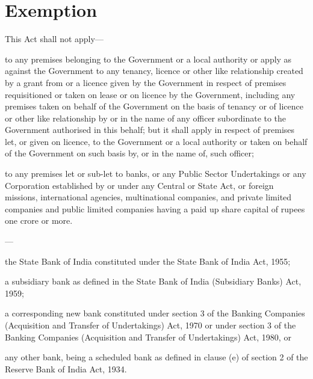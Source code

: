 \documentclass{mhact}
\begin{document}
\section{Exemption}
\begin{subsectionlist}
\item This Act shall not apply---
  \begin{clause}
  \item to any premises belonging to the Government or a local
    authority or apply as against the Government to any tenancy,
    licence or other like relationship created by a grant from or a
    licence given by the Government in respect of premises
    requisitioned or taken on lease or on licence by the Government,
    including any premises taken on behalf of the Government on the
    basis of tenancy or of licence or other like relationship by or in
    the name of any officer subordinate to the Government authorised
    in this behalf; but it shall apply in respect of premises let, or
    given on licence, to the Government or a local authority or taken
    on behalf of the Government on such basis by, or in the name of,
    such officer;
  \item to any premises let or sub-let to banks, or any Public Sector
    Undertakings or any Corporation established by or under any
    Central or State Act, or foreign missions, international agencies,
    multinational companies, and private limited companies and public
    limited companies having a paid up share capital of rupees one
    crore or more.

    ---
    
    \begin{subclause}
    \item  the State Bank of India constituted under the State Bank of India Act,
      1955; 
    \item  a subsidiary bank as defined in the State Bank of India (Subsidiary
      Banks) Act, 1959;

    \item a corresponding new bank constituted under section 3 of the
      Banking Companies (Acquisition and Transfer of Undertakings)
      Act, 1970 or under section 3 of the Banking
      Companies (Acquisition and Transfer of Undertakings) Act,
      1980, or
    \item any other bank, being a scheduled bank as defined in clause
      (e) of section 2 of the Reserve Bank of India Act,
      1934.
    \end{subclause}
  \end{clause}


\end{subsectionlist}
\end{document}
